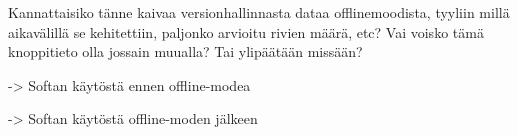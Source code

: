 
Kannattaisiko tänne kaivaa versionhallinnasta dataa offlinemoodista, tyyliin millä aikavälillä se kehitettiin, paljonko arvioitu rivien määrä, etc? Vai voisko tämä knoppitieto olla jossain muualla? Tai ylipäätään missään?




-> Softan käytöstä ennen offline-modea

-> Softan käytöstä offline-moden jälkeen







